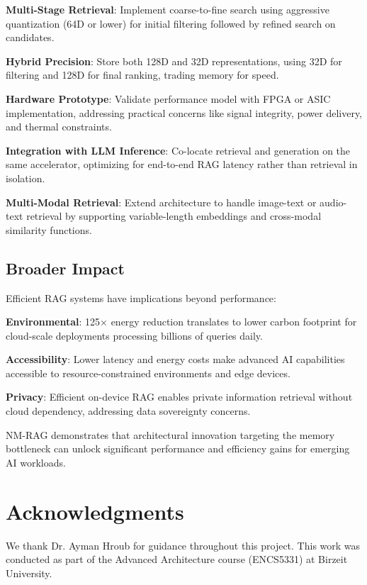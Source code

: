 \documentclass[conference]{IEEEtran}
\begin{document}
\textbf{Multi-Stage Retrieval}: Implement coarse-to-fine search using aggressive quantization (64D or lower) for initial filtering followed by refined search on candidates.

\textbf{Hybrid Precision}: Store both 128D and 32D representations, using 32D for filtering and 128D for final ranking, trading memory for speed.

\textbf{Hardware Prototype}: Validate performance model with FPGA or ASIC implementation, addressing practical concerns like signal integrity, power delivery, and thermal constraints.

\textbf{Integration with LLM Inference}: Co-locate retrieval and generation on the same accelerator, optimizing for end-to-end RAG latency rather than retrieval in isolation.

\textbf{Multi-Modal Retrieval}: Extend architecture to handle image-text or audio-text retrieval by supporting variable-length embeddings and cross-modal similarity functions.

\subsection{Broader Impact}

Efficient RAG systems have implications beyond performance:

\textbf{Environmental}: 125$\times$ energy reduction translates to lower carbon footprint for cloud-scale deployments processing billions of queries daily.

\textbf{Accessibility}: Lower latency and energy costs make advanced AI capabilities accessible to resource-constrained environments and edge devices.

\textbf{Privacy}: Efficient on-device RAG enables private information retrieval without cloud dependency, addressing data sovereignty concerns.

NM-RAG demonstrates that architectural innovation targeting the memory bottleneck can unlock significant performance and efficiency gains for emerging AI workloads.

\section*{Acknowledgments}

We thank Dr. Ayman Hroub for guidance throughout this project. This work was conducted as part of the Advanced Architecture course (ENCS5331) at Birzeit University.
\end{document}
